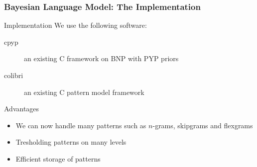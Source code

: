 \documentclass{beamer}
\def\CC{{C\nolinebreak[4]\hspace{-.05em}\raisebox{.4ex}{\tiny\bf ++}}}
\begin{document}
\begin{frame}
    \frametitle{Bayesian Language Model: The Implementation}

    \begin{block}{Implementation}
        We use the following software:
        \begin{description}
            \item[cpyp] an existing \CC{} framework on BNP with PYP priors
            \item[colibri] an existing \CC{} pattern model framework 
        \end{description}
    \end{block}

    \begin{block}{Advantages}
        \begin{itemize}
            \item We can now handle many patterns such as $n$-grams, skipgrams and flexgrams
            \item Tresholding patterns on many levels
            \item Efficient storage of patterns
        \end{itemize}
    \end{block}
\end{frame}
\end{document}
